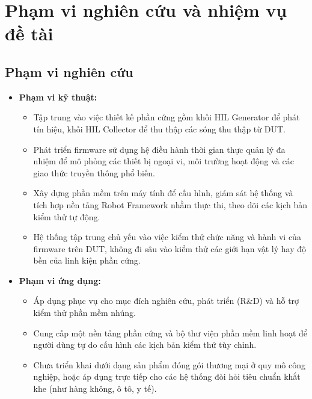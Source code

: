 \section{Phạm vi nghiên cứu và nhiệm vụ đề tài}
\subsection{Phạm vi nghiên cứu}
\begin{itemize}
    \item \textbf{Phạm vi kỹ thuật:}
    \begin{itemize}
        \item[-] Tập trung vào việc thiết kế phần cứng gồm khối HIL Generator để phát tín hiệu, khối HIL Collector để thu thập các sóng thu thập từ DUT.
        \item[-] Phát triển firmware sử dụng hệ điều hành thời gian thực quản lý đa nhiệm để mô phỏng các thiết bị ngoại vi, môi trường hoạt động và các giao thức truyền thông phổ biến.
        \item[-] Xây dựng phần mềm trên máy tính để cấu hình, giám sát hệ thống và tích hợp nền tảng Robot Framework nhằm thực thi, theo dõi các kịch bản kiểm thử tự động.
        \item[-] Hệ thống tập trung chủ yếu vào việc kiểm thử chức năng và hành vi của firmware trên DUT, không đi sâu vào kiểm thử các giới hạn vật lý hay độ bền của linh kiện phần cứng.
    \end{itemize}

    \item \textbf{Phạm vi ứng dụng:}
    \begin{itemize}
        \item[-] Áp dụng phục vụ cho mục đích nghiên cứu, phát triển (R\&D) và hỗ trợ kiểm thử phần mềm nhúng.
        \item[-] Cung cấp một nền tảng phần cứng và bộ thư viện phần mềm linh hoạt để người dùng tự do cấu hình các kịch bản kiểm thử tùy chỉnh.
        \item[-] Chưa triển khai dưới dạng sản phẩm đóng gói thương mại ở quy mô công nghiệp, hoặc áp dụng trực tiếp cho các hệ thống đòi hỏi tiêu chuẩn khắt khe (như hàng không, ô tô, y tế).
    \end{itemize}
\end{itemize}



